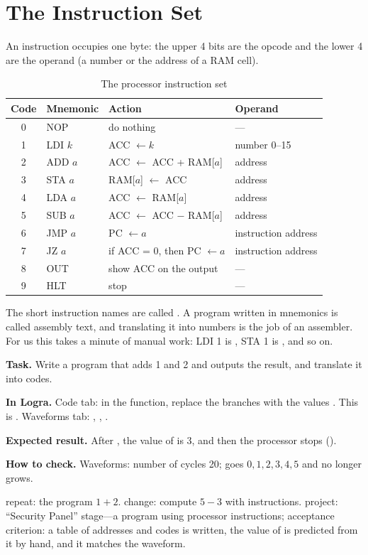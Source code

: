 \section{The Instruction Set}

An instruction occupies one byte: the upper 4 bits are the opcode and the lower 4
are the operand (a number or the address of a RAM cell).

\begin{table}[H]
\centering
\caption{The processor instruction set}
\small
\begin{tabular}{clll}
\toprule
\textbf{Code} & \textbf{Mnemonic} & \textbf{Action} & \textbf{Operand} \\
\midrule
0 & NOP & do nothing & --- \\
1 & LDI $k$ & ACC $\leftarrow k$ & number 0--15 \\
2 & ADD $a$ & ACC $\leftarrow$ ACC + RAM[$a$] & address \\
3 & STA $a$ & RAM[$a$] $\leftarrow$ ACC & address \\
4 & LDA $a$ & ACC $\leftarrow$ RAM[$a$] & address \\
5 & SUB $a$ & ACC $\leftarrow$ ACC $-$ RAM[$a$] & address \\
6 & JMP $a$ & PC $\leftarrow a$ & instruction address \\
7 & JZ $a$ & if ACC = 0, then PC $\leftarrow a$ & instruction address \\
8 & OUT & show ACC on the output & --- \\
9 & HLT & stop & --- \\
\bottomrule
\end{tabular}
\end{table}

The short instruction names are called . A program written in
mnemonics is called assembly text, and translating it into numbers is the job of
an assembler. For us this takes a minute of manual work: LDI 1 is ,
STA 1 is , and so on.

\begin{diybox}
\textbf{Task.} Write a program that adds 1 and 2 and outputs the result, and translate it into codes.

\textbf{In Logra.} Code tab: in the  function, replace the  branches with the values . This is . Waveforms tab: , , .

\textbf{Expected result.} After , the value of  is 3, and then the processor stops ().

\textbf{How to check.} Waveforms: number of cycles 20;  goes $0,1,2,3,4,5$ and no longer grows.

 repeat: the program $1+2$.  change: compute $5-3$ with  instructions.  project: ``Security Panel'' stage---a program using processor instructions; acceptance criterion: a table of addresses and codes is written, the value of  is predicted from it by hand, and it matches the waveform.
\end{diybox}

